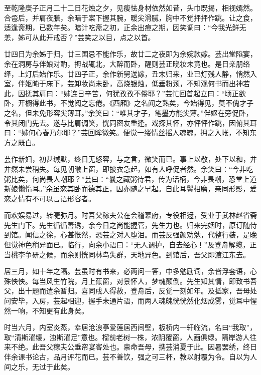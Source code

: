 \documentclass[]{article}
\begin{document}
至乾隆庚子正月二十二日花烛之夕，见瘦怯身材依然如昔，头巾既揭，相视嫣然。合卺后，并肩夜膳，余暗于案下握其腕，暖尖滑腻，胸中不觉抨抨作跳。让之食，适逢斋期，已数年矣。暗计吃斋之初，正余出痘之期，因笑调曰：``今我光鲜无恙，姊可从此开戒否？''芸笑之以目，点之以首。

廿四日为余姊于归，廿三国忌不能作乐，故廿二之夜即为余婉款嫁。芸出堂陷宴，余在洞房与伴娘对酌，拇战辄北，大醉而卧，醒则芸正晓妆未竟也。是日亲朋络绎，上灯后始作乐。廿四子正，余作新舅送嫁，丑末归来，业已灯残人静，悄然入室，伴妪盹于床下，芸卸妆尚未卧，高烧银烛，低垂粉颈，不知观何书而出神若此，因抚其肩曰：``姊连日辛苦，何犹孜孜不倦耶？''芸忙回首起立曰：``顷正欲卧，开橱得此书，不觉阅之忘倦。《西厢》之名闻之熟矣，今始得见，莫不傀才子之名，但未免形容尖薄耳。''余笑曰：``唯其才子，笔墨方能尖薄。''伴妪在旁促卧，令其闭门先去。遂与比肩调笑，恍同密友重逢。戏探其怀，亦怦怦作跳，因俯其耳曰：``姊何心舂乃尔耶？''芸回眸微笑。便觉一缕情丝摇人魂魄，拥之入帐，不知东方之既白。

芸作新妇，初甚缄默，终日无怒容，与之言，微笑而已。事上以敬，处下以和，井井然未尝稍失。每见朝暾上窗，即披衣急起，如有人呼促者然。余笑曰：``今非吃粥比矣，何尚畏人嘲耶？''芸曰：``曩之藏粥待君，传为话柄，今非畏嘲，恐堂上道新娘懒惰耳。''余虽恋其卧而德其正，因亦随之早起。自此耳鬓相磨，亲同形影，爱恋之情有不可以言语形容者。

而欢娱易过，转睫弥月。时吾父稼夫公在会稽幕府，专役相迓，受业于武林赵省斋先生门下。先生循循善诱，余今日之尚能握管，先生力也。归来完姻时，原订随侍到馆。闻信之徐，心甚怅然，恐芸之对人堕泪。而芸反强颜劝勉，代整行装，是晚但觉神色稍异面已。临行，向余小语曰：``无人调护，自去经心！''及登舟解缆，正当桃李争研之候，而余则恍同林鸟失群，天地异色。到馆后，吾父即渡江东去。

居三月，如十年之隔。芸虽时有书来，必两问一答，中多勉励词，余皆浮套语，心殊怏怏。每当风生竹院，月上蕉窗，对景怀人，梦魂颠倒。先生知其情，即致书吾父，出十题而遣余暂归。喜同戍人得赦，登舟后，反觉一刻如年。及抵家，吾母处问安毕，入房，芸起相迎，握手未通片语，而两人魂魄恍恍然化烟成雾，觉耳中惺然一响，不知更有此身矣。

时当六月，内室炎蒸，幸居沧浪亭爱莲居西间壁，板桥内一轩临流，名曰``我取''，取``清斯濯缨，浊斯濯足''意也。榴前老树一株，浓阴覆窗，人画俱绿。隔岸游人往来不绝。此吾父稼夫公垂帘宴客处也。禀命吾母，携芸消夏于此。因暑罢绣，终日伴余课书论古，品月评花而已。芸不善饮，强之可三杯，教以射覆为令。自以为人间之乐，无过于此矣。
\end{document}
